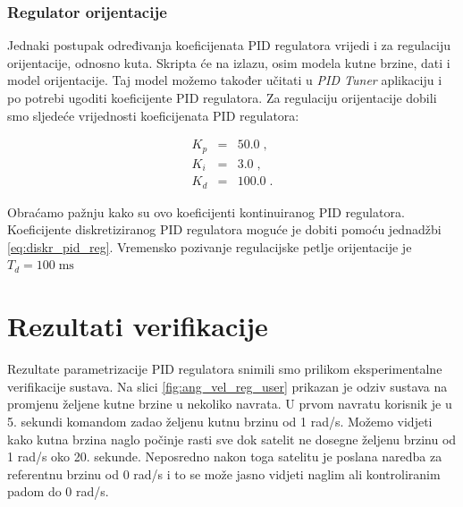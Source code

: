 \documentclass[times, utf8, diplomski, numeric]{templates/template}
\begin{document}
{{{            \subsubsection{Regulator orijentacije}{
                Jednaki postupak određivanja koeficijenata PID regulatora vrijedi i za regulaciju orijentacije, odnosno kuta. Skripta će na izlazu, osim modela kutne brzine, dati i model orijentacije. Taj model možemo također učitati u \emph{PID Tuner} aplikaciju i po potrebi ugoditi koeficijente PID regulatora. Za regulaciju orijentacije dobili smo sljedeće vrijednosti koeficijenata PID regulatora:

                \begin{equation}
                \begin{array}{rcl}
                    K_p & = &  50.0 \; , \\
                    K_i & = &   3.0 \; , \\
                    K_d & = & 100.0 \; .
                \end{array}
                \end{equation}

                Obraćamo pažnju kako su ovo koeficijenti kontinuiranog PID regulatora. Koeficijente diskretiziranog PID regulatora moguće je dobiti pomoću jednadžbi \ref{eq:diskr_pid_reg}. Vremensko pozivanje regulacijske petlje orijentacije je $T_d = 100 \; \text{ms}$
            }
        }
    }

    \section{Rezultati verifikacije}{
        Rezultate parametrizacije PID regulatora snimili smo prilikom eksperimentalne verifikacije sustava. Na slici \ref{fig:ang_vel_reg_user} prikazan je odziv sustava na promjenu željene kutne brzine u nekoliko navrata. U prvom navratu korisnik je u 5. sekundi komandom zadao željenu kutnu brzinu od 1 rad/s. Možemo vidjeti kako kutna brzina naglo počinje rasti sve dok satelit ne dosegne željenu brzinu od 1 rad/s oko 20. sekunde. Neposredno nakon toga satelitu je poslana naredba za referentnu brzinu od 0 rad/s i to se može jasno vidjeti naglim ali kontroliranim padom do 0 rad/s. 

}}
\end{document}
